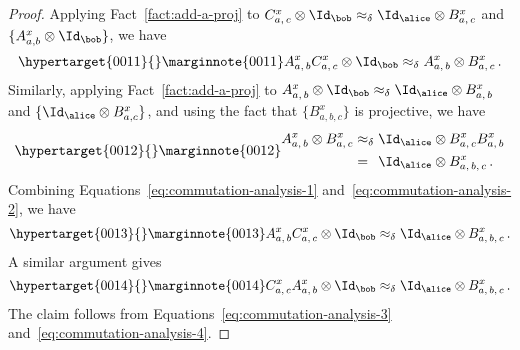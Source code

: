 \begin{proof}
  Applying Fact~\ref{fact:add-a-proj} to $C^x_{a,\, c} \otimes \Id_\bob
  \approx_\delta \Id_\alice \otimes B^x_{a,\, c}$ and $\{A^x_{a,b} \otimes
  \Id_\bob \}$, we have
  \begin{equation}
\hypertarget{0011}{}
\reversemarginpar\marginnote{\textnormal{0011}}
    \label{eq:commutation-analysis-1}
    A^x_{a,\, b} C^x_{a,\, c} \otimes \Id_\bob
    \approx_\delta A^x_{a,\, b} \otimes B^x_{a,\, c}\,.
  \end{equation}
  Similarly, applying Fact~\ref{fact:add-a-proj} to $A^x_{a,\, b} \otimes
  \Id_\bob \approx_\delta \Id_\alice \otimes B^x_{a,\, b}$ and $\{\Id_\alice
  \otimes B^x_{a,c}\}$, and using the fact that $\{B^x_{a,b,c}\}$ is projective,
  we have
  \begin{equation}
\hypertarget{0012}{}
\reversemarginpar\marginnote{\textnormal{0012}}
    \label{eq:commutation-analysis-2}
    \begin{split}
      A^x_{a,\, b} \otimes B^x_{a,\, c}
      & \approx_\delta \Id_\alice \otimes B^x_{a,\, c} B^x_{a,\, b}\\
      & =_{\phantom{\delta}} \Id_\alice \otimes B^x_{a,\, b,\, c}\,.
    \end{split}
  \end{equation}
  Combining Equations~\eqref{eq:commutation-analysis-1}
  and~\eqref{eq:commutation-analysis-2}, we have
  \begin{equation}
\hypertarget{0013}{}
\reversemarginpar\marginnote{\textnormal{0013}}
    \label{eq:commutation-analysis-3}
    A^x_{a,\, b} C^x_{a,\, c} \otimes \Id_\bob \approx_\delta
    \Id_\alice \otimes B^x_{a,\, b,\, c}\,.
  \end{equation}
  A similar argument gives
  \begin{equation}
\hypertarget{0014}{}
\reversemarginpar\marginnote{\textnormal{0014}}
    \label{eq:commutation-analysis-4}
    C^x_{a,\, c} A^x_{a,\, b} \otimes \Id_\bob \approx_\delta
    \Id_\alice \otimes B^x_{a,\, b,\, c}\,.
  \end{equation}
  The claim follows from Equations~\eqref{eq:commutation-analysis-3}
  and~\eqref{eq:commutation-analysis-4}.
\end{proof}

